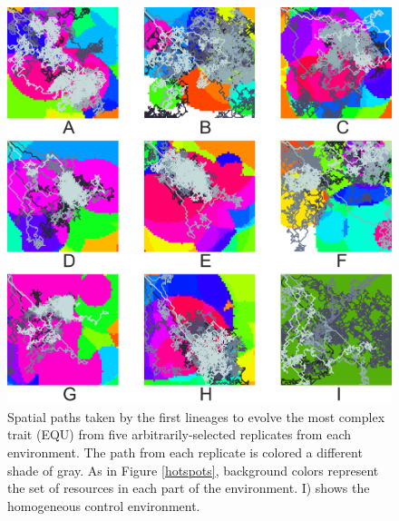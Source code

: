 \begin{figure}[t]
\begin{center}
\includegraphics[width=5in]{figs/control_9_paths.png}
\caption{Spatial paths taken by the first lineages to evolve the most complex trait (EQU) from five arbitrarily-selected replicates from each environment. The path from each replicate is colored a different shade of gray. As in Figure \ref{hotspots}, background colors represent the set of resources in each part of the environment. I) shows the homogeneous control environment.}
\label{paths}
\end{center}
\end{figure}

